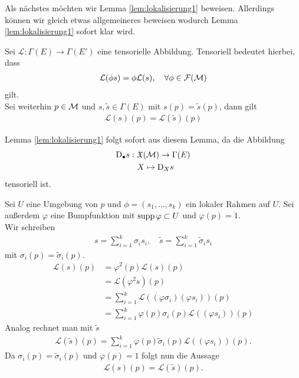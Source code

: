 
Als nächstes möchten wir Lemma \ref{lem:lokalisierung1} beweisen.
Allerdings können wir gleich etwas allgemeineres beweisen wodurch Lemma \ref{lem:lokalisierung1} sofort klar wird.

\begin{lem}
\label{lem:tensorielllokalisierung}
Sei $\mathcal{L}: \Gamma (E) \to \Gamma(E')$ eine tensorielle Abbildung. 
Tensoriell bedeutet hierbei, dass
\begin{align}
\mathcal{L}(\phi s) = \phi \mathcal{L}(s), \quad \forall \phi \in \mathcal{F}(\mathcal{M})
\end{align}
gilt.\\
Sei weiterhin $p\in \mathcal{M}$ und $s, \tilde{s} \in \Gamma(E)$ mit $s(p) = \tilde{s}(p)$, dann gilt
\begin{align}
\mathcal{L}(s)(p) = \mathcal{L}(\tilde{s})(p)
\end{align} 
\end{lem}
Lemma \ref{lem:lokalisierung1} folgt sofort aus diesem Lemma, da die Abbildung
\begin{align*}
\mathrm{D}_\bullet s : \ & \mathfrak{X}(\mathcal{M}) \to \Gamma (E)\\
& X \mapsto \mathrm{D}_X s
\end{align*}
tensoriell ist.

\begin{bew}
Sei $U$ eine Umgebung von $p$ und $\phi = (s_1, \dots, s_k)$ ein lokaler Rahmen auf $U$.
Sei außerdem $\varphi$ eine Bumpfunktion mit $\operatorname{supp} \varphi \subset U$ und $\varphi (p) = 1$.\\
Wir schreiben 
\begin{align}
s = \sum_{i=1}^k \sigma_i s_i , \quad \tilde{s} = \sum_{i=1}^k \tilde{\sigma}_i s_i
\end{align}
mit $\sigma_i (p) = \tilde{\sigma}_i (p)$.
\begin{align*}
\mathcal{L}(s)(p) &= \varphi^2 (p) \mathcal{L}(s)(p)\\
&= \mathcal{L}(\varphi^2 s)(p)\\
&= \sum_{i = 1}^k \mathcal{L}((\varphi \sigma_i)(\varphi s_i)) (p)\\
&= \sum_{i = 1}^k \varphi (p) \sigma_i (p) \mathcal{L}((\varphi s_i)) (p) 
\end{align*}
Analog rechnet man mit $\tilde{s}$
\begin{align}
\mathcal{L}(\tilde{s})(p) = \sum_{i = 1}^k \varphi (p) \tilde{\sigma}_i (p) \mathcal{L}((\varphi s_i)) (p) .
\end{align}
Da $\sigma_i (p) = \tilde{\sigma}_i (p)$ und $\varphi(p)=1$ folgt nun die Aussage
\begin{align*}
\mathcal{L}(s)(p) = \mathcal{L}(\tilde{s})(p).
\end{align*}
\end{bew}

